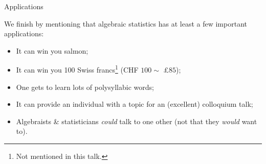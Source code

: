 \begin{frame}{Applications}

We finish by mentioning that algebraic statistics has at least a few important applications:

\begin{itemize}
    \item It can win you salmon;
    \item It can win you 100 Swiss francs\footnote{Not mentioned in this talk.} (CHF $100 \sim$ £$85$);
    \item One gets to learn lots of polysyllabic words;
    \item It can provide an individual with a topic for an (excellent) colloquium talk;
    \item Algebraists \& statisticians \emph{could} talk to one other (not that they \emph{would} want to).
\end{itemize}

\end{frame}